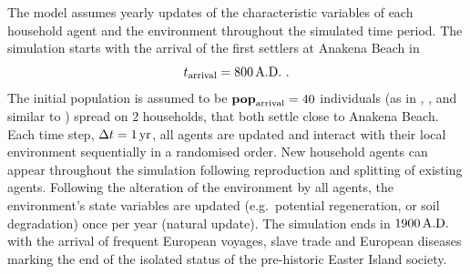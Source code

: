 The model assumes yearly updates of the characteristic variables of each household agent and the environment throughout the simulated time period.
The simulation starts with the arrival of the first settlers at Anakena Beach in
\begin{equation}
t_\text{arrival} = 800\, {\rm A.D.}\ .
\end{equation}
The initial population is assumed to be $\mathbf{pop}_{\rm arrival} = 40$ individuals (as in \citet{Good2006}, \citet{Brander1998}, and similar to \citet{Brandt2015}) spread on $2$ households, that both settle close to Anakena Beach.
Each time step, $\Delta t=1\,{\rm yr}$, all agents are updated and interact with their local environment sequentially in a randomised order. 
New household agents can appear throughout the simulation following reproduction and splitting of existing agents. 
Following the alteration of the environment by all agents, the environment's state variables are updated (e.g.\ potential regeneration, or soil degradation) once per year (natural update).
The simulation ends in $1900\, {\rm A.D.}$ with the arrival of frequent European voyages, slave trade and European diseases marking the end of the isolated status of the pre-historic Easter Island society.%
